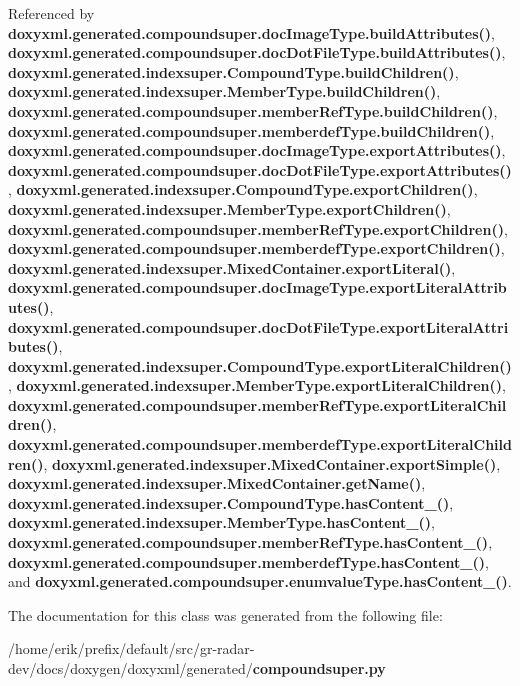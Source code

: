 Referenced by {\bf doxyxml.\+generated.\+compoundsuper.\+doc\+Image\+Type.\+build\+Attributes()}, {\bf doxyxml.\+generated.\+compoundsuper.\+doc\+Dot\+File\+Type.\+build\+Attributes()}, {\bf doxyxml.\+generated.\+indexsuper.\+Compound\+Type.\+build\+Children()}, {\bf doxyxml.\+generated.\+indexsuper.\+Member\+Type.\+build\+Children()}, {\bf doxyxml.\+generated.\+compoundsuper.\+member\+Ref\+Type.\+build\+Children()}, {\bf doxyxml.\+generated.\+compoundsuper.\+memberdef\+Type.\+build\+Children()}, {\bf doxyxml.\+generated.\+compoundsuper.\+doc\+Image\+Type.\+export\+Attributes()}, {\bf doxyxml.\+generated.\+compoundsuper.\+doc\+Dot\+File\+Type.\+export\+Attributes()}, {\bf doxyxml.\+generated.\+indexsuper.\+Compound\+Type.\+export\+Children()}, {\bf doxyxml.\+generated.\+indexsuper.\+Member\+Type.\+export\+Children()}, {\bf doxyxml.\+generated.\+compoundsuper.\+member\+Ref\+Type.\+export\+Children()}, {\bf doxyxml.\+generated.\+compoundsuper.\+memberdef\+Type.\+export\+Children()}, {\bf doxyxml.\+generated.\+indexsuper.\+Mixed\+Container.\+export\+Literal()}, {\bf doxyxml.\+generated.\+compoundsuper.\+doc\+Image\+Type.\+export\+Literal\+Attributes()}, {\bf doxyxml.\+generated.\+compoundsuper.\+doc\+Dot\+File\+Type.\+export\+Literal\+Attributes()}, {\bf doxyxml.\+generated.\+indexsuper.\+Compound\+Type.\+export\+Literal\+Children()}, {\bf doxyxml.\+generated.\+indexsuper.\+Member\+Type.\+export\+Literal\+Children()}, {\bf doxyxml.\+generated.\+compoundsuper.\+member\+Ref\+Type.\+export\+Literal\+Children()}, {\bf doxyxml.\+generated.\+compoundsuper.\+memberdef\+Type.\+export\+Literal\+Children()}, {\bf doxyxml.\+generated.\+indexsuper.\+Mixed\+Container.\+export\+Simple()}, {\bf doxyxml.\+generated.\+indexsuper.\+Mixed\+Container.\+get\+Name()}, {\bf doxyxml.\+generated.\+indexsuper.\+Compound\+Type.\+has\+Content\+\_\+()}, {\bf doxyxml.\+generated.\+indexsuper.\+Member\+Type.\+has\+Content\+\_\+()}, {\bf doxyxml.\+generated.\+compoundsuper.\+member\+Ref\+Type.\+has\+Content\+\_\+()}, {\bf doxyxml.\+generated.\+compoundsuper.\+memberdef\+Type.\+has\+Content\+\_\+()}, and {\bf doxyxml.\+generated.\+compoundsuper.\+enumvalue\+Type.\+has\+Content\+\_\+()}.



The documentation for this class was generated from the following file\+:\begin{DoxyCompactItemize}
\item 
/home/erik/prefix/default/src/gr-\/radar-\/dev/docs/doxygen/doxyxml/generated/{\bf compoundsuper.\+py}\end{DoxyCompactItemize}

